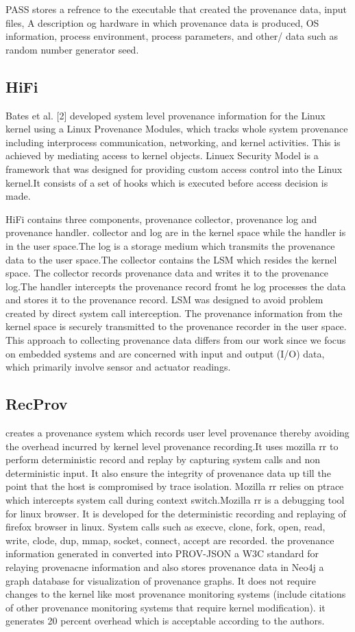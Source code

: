 PASS stores a refrence to the executable that created the provenance data, input files, A description og hardware in which provenance data is produced, OS information, process environment, process parameters, and other/ data such as random number generator seed.

\subsection{HiFi}
Bates et al. [2] developed system level provenance information for the Linux kernel using a Linux Provenance Modules, which tracks whole system provenance including interprocess communication, networking, and kernel activities. This is achieved by mediating access to kernel objects. Linuex Security Model is a framework that was designed for providing custom access control into the Linux kernel.It consists of a set of hooks which is executed before access decision is made.

HiFi contains three components, provenance collector, provenance log and provenance handler. collector and log are in the kernel space while the handler is in the user space.The log is a storage medium which transmits the provenance data to the user space.The collector contains the LSM which resides the kernel space. The collector records provenance data and writes it to the provenance log.The handler intercepts the provenance record fromt he log processes the data and stores it to the provenance record. LSM was designed to avoid problem created by direct system call interception. The provenance information from the kernel space is securely transmitted to the provenance recorder in the user space. This approach to collecting provenance data differs from our work since we focus on embedded systems and are concerned with input and output (I/O) data, which primarily involve sensor and actuator readings.

\subsection{RecProv}

creates a provenance system which records user level provenance thereby avoiding the overhead incurred by kernel level provenance recording.It uses mozilla rr to perform deterministic record and replay by capturing system calls  and non deterministic input. It also ensure the integrity of provenance data up till the point that the host is compromised by trace isolation. Mozilla rr relies on ptrace which intercepts system call during context switch.Mozilla rr is a debugging tool for linux browser. It is developed for the deterministic recording and replaying of firefox browser in linux. System calls such as execve, clone, fork, open, read, write, clode, dup, mmap, socket, connect, accept are recorded. the provenance information generated in converted into PROV-JSON a W3C standard for relaying provenacne information and also stores provenance data in Neo4j a graph database for visualization of provenance graphs. It does not require changes to the kernel like most provenance monitoring systems (include citations of other provenance monitoring systems that require kernel modification). it generates 20 percent overhead which is acceptable according to the authors.


